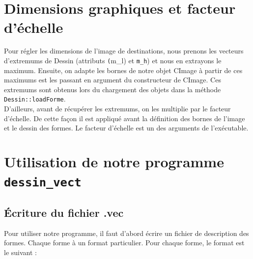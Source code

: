 \documentclass[11pt]{article}
\begin{document}
\section{Dimensions graphiques et facteur d'échelle}

Pour régler les dimensions de l'image de destinations, nous prenons les vecteurs d'extremums de Dessin (attributs \texttt(m\_l) et \texttt{m\_h}) et nous en extrayons le maximum. Ensuite, on adapte les bornes de notre objet CImage à partir de ces maximums est les passant en argument du constructeur de CImage. Ces extremums sont obtenus lors du chargement des objets dans la méthode \texttt{Dessin::loadForme}. \\

D'ailleurs, avant de récupérer les extremums, on les multiplie par le facteur d'échelle. De cette façon il est appliqué avant la définition des bornes de l'image et le dessin des formes. Le facteur d'échelle est un des arguments de l’exécutable. 

\section{Utilisation de notre programme \texttt{dessin\_vect}}

\subsection{Écriture du fichier .vec}

Pour utiliser notre programme, il faut d'abord écrire un fichier de description des formes. Chaque forme à un format particulier. Pour chaque forme, le format est le suivant : 
\end{document}
